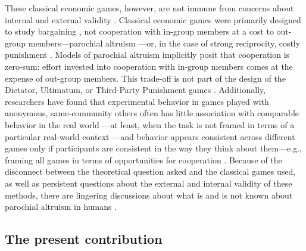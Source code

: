 \documentclass[bibauthoryear]{aa}
\begin{document}
These classical economic games, however, are not immune from concerns about internal and external validity \citep{Pisor2020, Naar2020}. Classical economic games were primarily designed to study bargaining \citep{Camerer1995}, not cooperation with in-group members at a cost to out-group members---parochial altruism \citep[e.g.,][]{yamagishi2016parochial}---or, in the case of strong reciprocity, costly punishment \citep{hagen2006game, guala2012reciprocity}. Models of parochial altruism implicitly posit that cooperation is zero-sum: effort invested into cooperation with in-group members comes at the expense of out-group members. This trade-off is not part of the design of the Dictator, Ultimatum, or Third-Party Punishment games \citep[see][for relevant discussion]{Gil-white2004}. Additionally, researchers have found that experimental behavior in games played with anonymous, same-community others often has little association with comparable behavior in the real world \citep{gurven2008collective, winking2013natural}---at least, when the task is not framed in terms of a particular real-world context \citep{cronk2007influence, hagen2006game, lesorogol2005experiments, lesorogol2007bringing, pisor2012importing, lightner2017}---and behavior appears consistent across different games only if participants are consistent in the way they think about them---e.g., framing all games in terms of opportunities for cooperation \citep{yamagishi2013behavioral}. Because of the disconnect between the theoretical question asked and the classical games used, as well as persistent questions about the external and internal validity of these methods, there are lingering discussions about what is and is not known about parochial altruism in humans \citep{Rusch2014,yamagishi2016parochial}.

\subsection{The present contribution}
\end{document}

